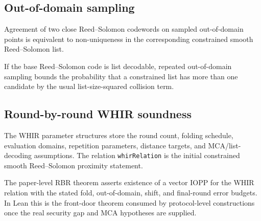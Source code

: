 \subsection{Out-of-domain sampling}\label{sec:whir_ood}

\begin{lemma}\label{lem:whir_ood_equiv}
    Agreement of two close Reed--Solomon codewords on sampled out-of-domain points is equivalent
    to non-uniqueness in the corresponding constrained smooth Reed--Solomon list.
\end{lemma}

\begin{lemma}\label{lem:whir_ood_bound}
    If the base Reed--Solomon code is list decodable, repeated out-of-domain sampling bounds
    the probability that a constrained list has more than one candidate by the usual
    list-size-squared collision term.
\end{lemma}

\subsection{Round-by-round WHIR soundness}\label{sec:whir_rbr}

\begin{definition}\label{def:whir_params}
    The WHIR parameter structures store the round count, folding schedule, evaluation domains,
    repetition parameters, distance targets, and MCA/list-decoding assumptions.  The relation
    \texttt{whirRelation} is the initial constrained smooth Reed--Solomon proximity statement.
\end{definition}

\begin{theorem}\label{thm:whir_rbr_soundness}
    The paper-level RBR theorem asserts existence of a vector IOPP for the WHIR relation with
    the stated fold, out-of-domain, shift, and final-round error budgets.  In Lean this is the
    front-door theorem consumed by protocol-level constructions once the real security gap and
    MCA hypotheses are supplied.
\end{theorem}

